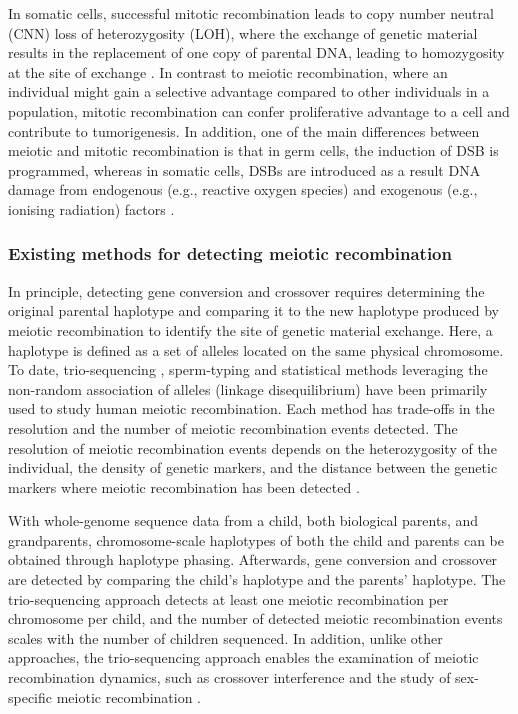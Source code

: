 In somatic cells, successful mitotic recombination leads to copy number neutral (CNN) loss of heterozygosity (LOH), where the exchange of genetic material results in the replacement of one copy of parental DNA, leading to homozygosity at the site of exchange \cite{}. In contrast to meiotic recombination, where an individual might gain a selective advantage compared to other individuals in a population, mitotic recombination can confer proliferative advantage to a cell and contribute to tumorigenesis. In addition, one of the main differences between meiotic and mitotic recombination is that in germ cells, the induction of DSB is programmed, whereas in somatic cells, DSBs are introduced as a result DNA damage from endogenous (e.g., reactive oxygen species) and exogenous (e.g., ionising radiation) factors \cite{}. 

\subsubsection{Existing methods for detecting meiotic recombination}

In principle, detecting gene conversion and crossover requires determining the original parental haplotype and comparing it to the new haplotype produced by meiotic recombination to identify the site of genetic material exchange. Here, a haplotype is defined as a set of alleles located on the same physical chromosome. To date, trio-sequencing \cite{Kong2010-uk}, sperm-typing \cite{Webb2008-pw} and statistical methods leveraging the non-random association of alleles (linkage disequilibrium) \cite{Myers2005-ml} have been primarily used to study human meiotic recombination. Each method has trade-offs in the resolution and the number of meiotic recombination events detected. The resolution of meiotic recombination events depends on the heterozygosity of the individual, the density of genetic markers, and the distance between the genetic markers where meiotic recombination has been detected \cite{}. 

With whole-genome sequence data from a child, both biological parents, and grandparents, chromosome-scale haplotypes of both the child and parents can be obtained through haplotype phasing. Afterwards, gene conversion and crossover are detected by comparing the child’s haplotype and the parents’ haplotype. The trio-sequencing approach detects at least one meiotic recombination per chromosome per child, and the number of detected meiotic recombination events scales with the number of children sequenced. In addition, unlike other approaches, the trio-sequencing approach enables the examination of meiotic recombination dynamics, such as crossover interference \cite{} and the study of sex-specific meiotic recombination \cite{}. 

